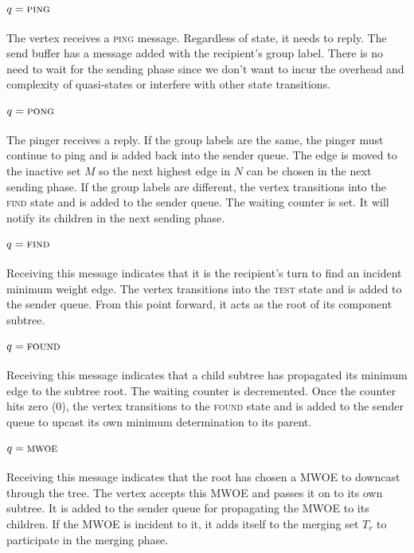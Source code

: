 \documentclass[11pt,epsf]{article}
\begin{document}
{{    \paragraph{$q = \textsc{ping}$}{
      The vertex receives a \textsc{ping} message. Regardless of state, it needs to reply.
      The send buffer has a message added with the recipient's group label. There is no need to
      wait for the sending phase since we don't want to incur the overhead and complexity of
      quasi-states or interfere with other state transitions.
    }
    \paragraph{$q = \textsc{pong}$}{
      The pinger receives a reply. If the group labels are the same, the pinger must continue
      to ping and is added back into the sender queue. The edge is moved to the inactive set $M$
      so the next highest edge in $N$ can be chosen in the next sending phase. If the group
      labels are different, the vertex transitions into the \textsc{find} state and is added to
      the sender queue. The waiting counter is set. It will notify its children in the next sending phase.
    }
    \paragraph{$q = \textsc{find}$}{
      Receiving this message indicates that it is the recipient's turn to find an incident minimum
      weight edge. The vertex transitions into the \textsc{test} state and is added to the sender queue.
      From this point forward, it acts as the root of its component subtree.
    }
    \paragraph{$q = \textsc{found}$}{
      Receiving this message indicates that a child subtree has propagated its minimum edge to the subtree
      root. The waiting counter is decremented. Once the counter hits zero (0), the vertex transitions
      to the \textsc{found} state and is added to the sender queue to upcast its own minimum determination
      to its parent.
    }
    \paragraph{$q = \textsc{mwoe}$}{
      Receiving this message indicates that the root has chosen a MWOE to downcast through the tree.
      The vertex accepts this MWOE and passes it on to its own subtree. It is added to the sender queue
      for propagating the MWOE to its children. If the MWOE is incident to it, it adds itself to the
      merging set $T_r$ to participate in the merging phase.
    }

}}
\end{document}
